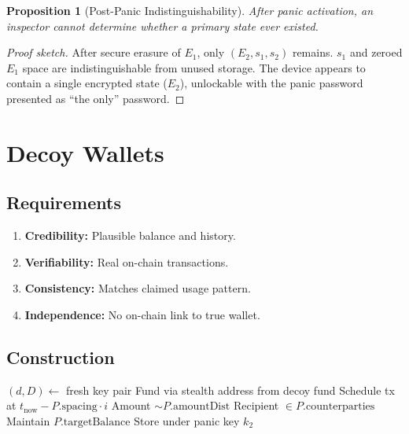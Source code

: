 \documentclass[11pt,a4paper]{article}
\newtheorem{proposition}{Proposition}[section]
\begin{document}
\begin{proposition}[Post-Panic Indistinguishability]
    After panic activation, an inspector cannot determine whether a
    primary state ever existed.
\end{proposition}

\begin{proof}[Proof sketch]
    After secure erasure of $E_1$, only $(E_2, s_1, s_2)$ remains.
    $s_1$ and zeroed $E_1$ space are indistinguishable from unused
    storage.  The device appears to contain a single encrypted state
    ($E_2$), unlockable with the panic password presented as
    ``the only'' password.
\end{proof}

\section{Decoy Wallets}
\label{sec:decoy}

\subsection{Requirements}

\begin{enumerate}
    \item \textbf{Credibility:} Plausible balance and history.
    \item \textbf{Verifiability:} Real on-chain transactions.
    \item \textbf{Consistency:} Matches claimed usage pattern.
    \item \textbf{Independence:} No on-chain link to true wallet.
\end{enumerate}

\subsection{Construction}

\begin{algorithm}[H]
\caption{Decoy Wallet Construction}
\label{alg:decoy-wallet}
\begin{algorithmic}[1]
    \State $(d, D) \gets$ fresh key pair
    \State Fund via stealth address from decoy fund
        \State Schedule tx at $t_{\mathrm{now}} - P.\mathrm{spacing} \cdot i$
        \State Amount $\sim P.\mathrm{amountDist}$
        \State Recipient $\in P.\mathrm{counterparties}$
    \EndFor
    \State Maintain $P.\mathrm{targetBalance}$
    \State Store under panic key $k_2$
\EndProcedure
\end{algorithmic}
\end{algorithm}
\end{document}
